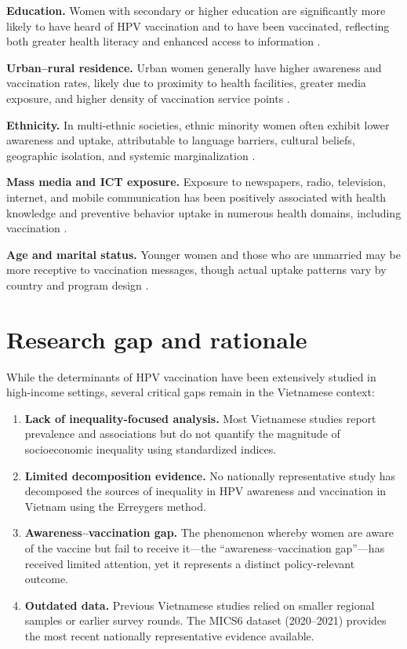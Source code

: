 \textbf{Education.} Women with secondary or higher education are significantly more likely to have heard of HPV vaccination and to have been vaccinated, reflecting both greater health literacy and enhanced access to information \cite{nguyen2021,bisi2022}.

\textbf{Urban--rural residence.} Urban women generally have higher awareness and vaccination rates, likely due to proximity to health facilities, greater media exposure, and higher density of vaccination service points \cite{tran2022,gallagher2018}.

\textbf{Ethnicity.} In multi-ethnic societies, ethnic minority women often exhibit lower awareness and uptake, attributable to language barriers, cultural beliefs, geographic isolation, and systemic marginalization \cite{pham2020}.

\textbf{Mass media and ICT exposure.} Exposure to newspapers, radio, television, internet, and mobile communication has been positively associated with health knowledge and preventive behavior uptake in numerous health domains, including vaccination \cite{wakefield2010,laz2012}.

\textbf{Age and marital status.} Younger women and those who are unmarried may be more receptive to vaccination messages, though actual uptake patterns vary by country and program design \cite{bruni2023}.

\section{Research gap and rationale}

While the determinants of HPV vaccination have been extensively studied in high-income settings, several critical gaps remain in the Vietnamese context:

\begin{enumerate}
	\item \textbf{Lack of inequality-focused analysis.} Most Vietnamese studies report prevalence and associations but do not quantify the magnitude of socioeconomic inequality using standardized indices.
	\item \textbf{Limited decomposition evidence.} No nationally representative study has decomposed the sources of inequality in HPV awareness and vaccination in Vietnam using the Erreygers method.
	\item \textbf{Awareness--vaccination gap.} The phenomenon whereby women are aware of the vaccine but fail to receive it---the ``awareness--vaccination gap''---has received limited attention, yet it represents a distinct policy-relevant outcome.
	\item \textbf{Outdated data.} Previous Vietnamese studies relied on smaller regional samples or earlier survey rounds. The MICS6 dataset (2020--2021) provides the most recent nationally representative evidence available.
\end{enumerate}

